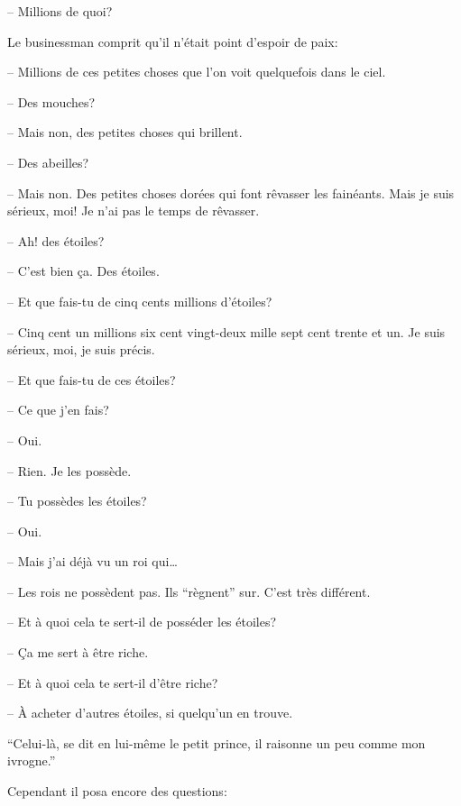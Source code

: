 \begin{Parallel}[p]{}{}
{-- Millions de quoi?

Le businessman comprit qu'il n'était point d'espoir de paix:

-- Millions de ces petites choses que l'on voit quelquefois dans le ciel.

-- Des mouches?

-- Mais non, des petites choses qui brillent.

-- Des abeilles?

-- Mais non. Des petites choses dorées qui font rêvasser les fainéants. Mais je suis sérieux, moi! Je
n'ai pas le temps de rêvasser.

-- Ah! des étoiles?

-- C'est bien ça. Des étoiles.

-- Et que fais-tu de cinq cents millions d'étoiles?

-- Cinq cent un millions six cent vingt-deux mille
sept cent trente et un. Je suis sérieux, moi, je suis
précis.

-- Et que fais-tu de ces étoiles?

-- Ce que j'en fais?

-- Oui.

-- Rien. Je les possède.

-- Tu possèdes les étoiles?

-- Oui.

-- Mais j'ai déjà vu un roi qui\ldots{}

-- Les rois ne possèdent pas. Ils ``règnent'' sur. C'est très différent.

-- Et à quoi cela te sert-il de posséder les étoiles?

-- Ça me sert à être riche.

-- Et à quoi cela te sert-il d'être riche?

-- À acheter d'autres étoiles, si quelqu'un en trouve.

``Celui-là, se dit en lui-même le petit prince, il raisonne un peu comme mon ivrogne.''

Cependant il posa encore des questions:


}


\end{Parallel}
